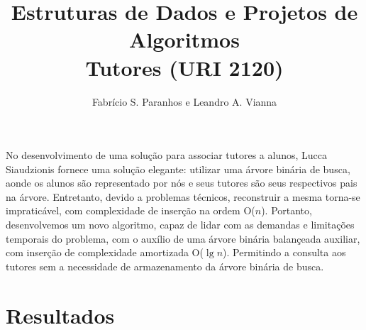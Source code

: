 \documentclass[12pt]{article}
\title{Estruturas de Dados e Projetos de Algoritmos\\Tutores (URI 2120)}
\author{Fabrício S. Paranhos\inst{1} e Leandro A. Vianna\inst{1}}
\begin{document}
 

\maketitle

     
\begin{resumo} 
  No desenvolvimento de uma solução para associar tutores a alunos, Lucca
  Siaudzionis fornece uma solução elegante: utilizar uma árvore binária de busca,
  aonde os alunos são representado por nós e seus tutores são seus respectivos
  pais na árvore. Entretanto, devido a problemas técnicos, reconstruir a mesma
  torna-se impraticável, com complexidade de inserção na ordem O($n$).
  Portanto, desenvolvemos um novo algoritmo, capaz de lidar com as demandas e limitações
  temporais do problema, com o auxílio de uma árvore binária balançeada
  auxiliar, com inserção de complexidade amortizada O($\lg n$). Permitindo a consulta aos
  tutores sem a necessidade de armazenamento da árvore binária de busca. 
\end{resumo}


\section{Resultados} \label{sec:res}
% 




\end{document}
